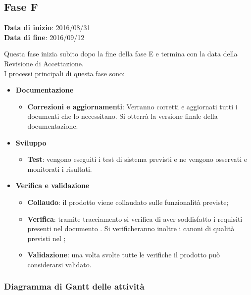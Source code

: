	\subsection{Fase F}
	\begin{center}
		\textbf{Data di inizio}: 2016/08/31 \\
		\textbf{Data di fine}: 2016/09/12 \\
	\end{center}
	Questa fase inizia subito dopo la fine della fase E e termina con la data della Revisione di Accettazione. \\
	I processi principali di questa fase sono:
		\begin{itemize}
			\item \textbf{Documentazione}
			\att
			\begin{itemize}
				\item \textbf{Correzioni e aggiornamenti}: Verranno corretti e aggiornati tutti i documenti che lo necessitano. Si otterrà la versione finale della documentazione. 
			\end{itemize}
			\item \textbf{Sviluppo}
			\att
				\begin{itemize}
					\item \textbf{Test}: vengono eseguiti i test di sistema previsti e ne vengono osservati e monitorati i risultati. 
				\end{itemize}
			\item \textbf{Verifica e validazione}
			\att
			\begin{itemize}
				\item \textbf{Collaudo}: il prodotto viene collaudato sulle funzionalità previste;
				\item \textbf{Verifica}: tramite tracciamento si verifica di aver soddisfatto i requisiti presenti nel documento \ARdocRA. Si verificheranno inoltre i canoni di qualità previsti nel \PQdocRA;
				\item \textbf{Validazione}: una volta svolte tutte le verifiche il prodotto può considerarsi validato.
			\end{itemize}
		\end{itemize}
		\subsubsection{Diagramma di Gantt delle attività}
		

